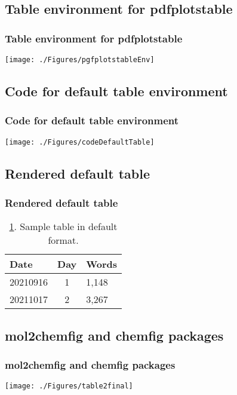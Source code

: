 \documentclass{beamer}
\begin{document}
\subsection{Table environment for pdfplotstable}
\begin{frame}
\frametitle{Table environment for pdfplotstable}
\begin{center}
    \texttt{[image: ./Figures/pgfplotstableEnv]}
\end{center}
\end{frame}
\note{}

\subsection{Code for default table environment}
\begin{frame}
\frametitle{Code for default table environment}
\begin{center}
    \texttt{[image: ./Figures/codeDefaultTable]}
\end{center}
\end{frame}
\note{}


\subsection{Rendered default table}
\begin{frame}
\frametitle{Rendered default table}
\begin{table}[htp]
    \centering
    \begin{tabular}{lcl}
       \hline
       Date & Day & Words \\ 
       \hline
        20210916 & 1 & 1,148  \\
        20211017 & 2 & 3,267 \\
       \hline    
    \end{tabular}
    \caption{\ref{tab:simpleTable}. Sample table in default format. }
    \label{tab:simpleTable}
\end{table}
\end{frame}
\note{}


\subsection{mol2chemfig and chemfig packages}
\begin{frame}
\frametitle{mol2chemfig and chemfig packages}
\begin{center}
    \texttt{[image: ./Figures/table2final]}
\end{center}
\end{frame}
\note{}
\end{document}
